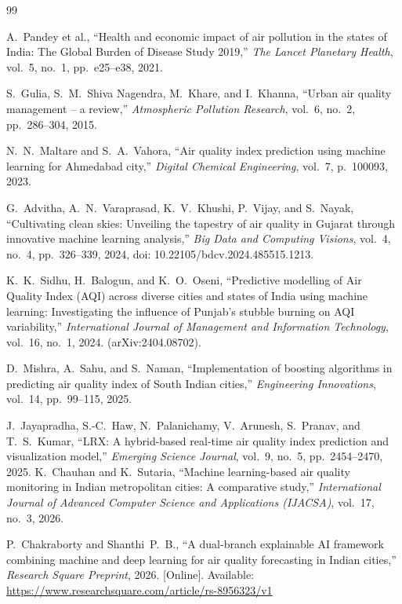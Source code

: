 \documentclass[11pt,a4paper]{article}
\begin{document}
\begin{thebibliography}{99}
\small

A.~Pandey et al., ``Health and economic impact of air pollution in the states of India: The Global Burden of Disease Study 2019,'' \emph{The Lancet Planetary Health}, vol.~5, no.~1, pp.~e25--e38, 2021.

S.~Gulia, S.~M.~Shiva Nagendra, M.~Khare, and I.~Khanna, ``Urban air quality management -- a review,'' \emph{Atmospheric Pollution Research}, vol.~6, no.~2, pp.~286--304, 2015.

N.~N.~Maltare and S.~A.~Vahora, ``Air quality index prediction using machine learning for Ahmedabad city,'' \emph{Digital Chemical Engineering}, vol.~7, p.~100093, 2023.

G.~Advitha, A.~N.~Varaprasad, K.~V.~Khushi, P.~Vijay, and S.~Nayak, ``Cultivating clean skies: Unveiling the tapestry of air quality in Gujarat through innovative machine learning analysis,'' \emph{Big Data and Computing Visions}, vol.~4, no.~4, pp.~326--339, 2024, doi: 10.22105/bdcv.2024.485515.1213.

K.~K.~Sidhu, H.~Balogun, and K.~O.~Oseni, ``Predictive modelling of Air Quality Index (AQI) across diverse cities and states of India using machine learning: Investigating the influence of Punjab's stubble burning on AQI variability,'' \emph{International Journal of Management and Information Technology}, vol.~16, no.~1, 2024. (arXiv:2404.08702).

D.~Mishra, A.~Sahu, and S.~Naman, ``Implementation of boosting algorithms in predicting air quality index of South Indian cities,'' \emph{Engineering Innovations}, vol.~14, pp.~99--115, 2025.

J.~Jayapradha, S.-C.~Haw, N.~Palanichamy, V.~Arunesh, S.~Pranav, and T.~S.~Kumar, ``LRX: A hybrid-based real-time air quality index prediction and visualization model,'' \emph{Emerging Science Journal}, vol.~9, no.~5, pp.~2454--2470, 2025.
K.~Chauhan and K.~Sutaria, ``Machine learning-based air quality monitoring in Indian metropolitan cities: A comparative study,'' \emph{International Journal of Advanced Computer Science and Applications (IJACSA)}, vol.~17, no.~3, 2026.

P.~Chakraborty and Shanthi~P.~B., ``A dual-branch explainable AI framework combining machine and deep learning for air quality forecasting in Indian cities,'' \emph{Research Square Preprint}, 2026. [Online]. Available: \url{https://www.researchsquare.com/article/rs-8956323/v1}


\end{thebibliography}
\end{document}
